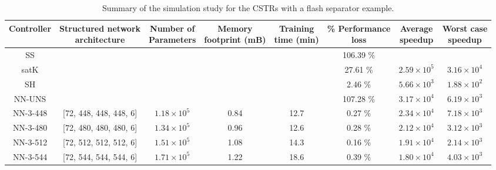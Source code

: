 \documentclass[preprint,5p, twocolumn, authoryear]{elsarticle}
\begin{document}
\begin{table}[t]
    \caption{Summary of the simulation study for the
    CSTRs with a flash separator example.}   
    \begin{tabular}{ |c|c|c|c|c|c|c|c| }
        \hline
        Controller & \thead{Structured network \\ architecture} & 
        \thead{Number of \\ Parameters} & 
        \thead{Memory \\ footprint (mB)} & \thead{Training \\ time (min)} &
        \thead{\% Performance\\ loss} & \thead{Average \\ speedup} & \thead{Worst case \\ speedup} \\
        \hline
    SS &  &  & &  & 106.39 \% &  & \\ 
    satK &  &  &  &  & 27.61 \% & $2.59 \times 10^5$ & 
    $3.16 \times 10^4$ \\ 
    SH &  &  &  &  & 2.46 \% & $5.66 \times 10^3$ & $1.88 \times 10^2$ \\ 
    NN-UNS &  &  &  &  & 107.28 \% & $3.17 \times 10^4$ & $6.19 \times 10^3$ \\ 
NN-3-448 & [72, 448, 448, 448, 6] & $1.18 \times 10^5$ & 0.84 & 12.7 & 0.27 \% & $2.34 \times 10^4$ & $7.18 \times 10^3$ \\ 
NN-3-480 & [72, 480, 480, 480, 6]  & $1.34 \times 10^5$ & 0.96  & 12.6 & 0.28 \% & $2.12 \times 10^4$ & $3.12 \times 10^3$ \\ 
NN-3-512 & [72, 512, 512, 512, 6]  & $1.51 \times 10^5$ & 1.08  & 14.3 & 0.16 \% & $1.91 \times 10^4$ & $2.14 \times 10^3$ \\ 
NN-3-544 & [72, 544, 544, 544, 6]  & $1.71 \times 10^5$ & 1.22  & 18.6 & 0.39 \% & $1.80 \times 10^4$ & $4.03 \times 10^3$ \\ 
        \hline
       \end{tabular}
       \label{table:cstrs}      
\end{table}
\end{document}
